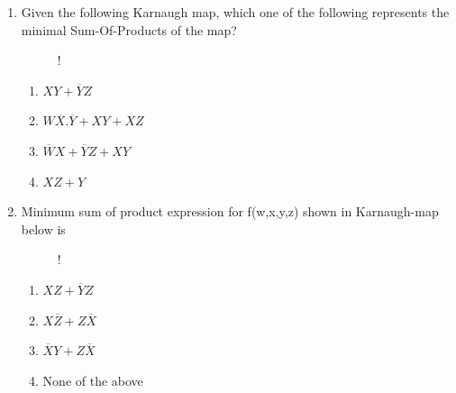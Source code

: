 \documentclass[journal,12pt,twocolumn]{IEEEtran}
\begin{document}
\begin{enumerate}
    \begin{figure}[!h]
\centering
\resizebox {\columnwidth} {!} {

}
\caption{}
\end{figure} 

    \item Given the following Karnaugh map, which one of the following represents the
minimal Sum-Of-Products of the map?
\begin{figure}[!h]
\centering
\resizebox {\columnwidth} {!} {

}
\caption{}
\end{figure} 

     \begin{enumerate}
      \item $XY+\overline{Y}Z$ 
      \item $W\overline{X}.\overline{Y}+XY+XZ$
      \item $\overline{W}X+\overline{Y}Z+XY$
      \item $XZ+Y$
    \end{enumerate}
     
    \item Minimum sum of product expression for f(w,x,y,z) shown in Karnaugh-map below
is
\begin{figure}[!h]
\centering
\resizebox {\columnwidth} {!} {

}
\caption{}
\end{figure}
     \begin{enumerate}
      \item $XZ+\overline{Y}Z$ 
      \item $X\overline{Z}+Z\overline{X}$
      \item $\overline{X}Y+Z\overline{X}$
      \item None of the above
    \end{enumerate}


\end{enumerate}
\end{document}
